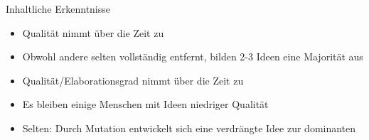 \begin{frame} {Inhaltliche Erkenntnisse}
	\begin{itemize}
		\item Qualität nimmt über die Zeit zu
		\item Obwohl andere selten vollständig entfernt, bilden 2-3 Ideen eine Majorität aus
		\item Qualität/Elaborationsgrad nimmt über die Zeit zu
		\item Es bleiben einige Menschen mit Ideen niedriger Qualität
		\item Selten: Durch Mutation entwickelt sich eine verdrängte Idee zur dominanten
	\end{itemize}
\end{frame}
